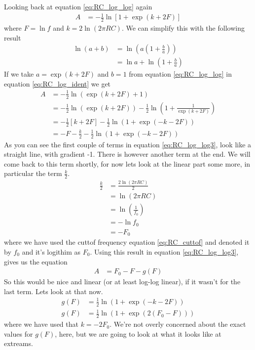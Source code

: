 Looking back at equation \ref{eq:RC_log_log} again
\begin{align}
  A &=-\frac{1}{2}\ln \left[ 1+\exp \left( k + 2F \right) \right] \label{eq:RC_log_log2}
\end{align}
where $F=\ln f$ and $k=2 \ln \left( 2 \pi R C \right)$. We can simplify this with
the following result
\begin{align}
  \ln(a+b) &= \ln\left(a\left(1+\frac{b}{a}\right)\right) \nonumber \\
  &= \ln a + \ln\left(1+\frac{b}{a}\right) \label{eq:RC_log_ident}
\end{align}
If we take $a=\exp \left( k + 2F \right)$ and $b=1$ from equation \ref{eq:RC_log_log} in equation \ref{eq:RC_log_ident} we get
\begin{align}
  A &= -\frac{1}{2}\ln(\exp \left( k + 2F \right)+1) \nonumber \\
  &= -\frac{1}{2}\ln \left(\exp \left( k + 2F \right)\right) -\frac{1}{2}\ln\left(1+\frac{1}{\exp \left( k + 2F \right)}\right) \nonumber \\
  &= -\frac{1}{2}\left[ k + 2F \right]-\frac{1}{2}\ln\left(1+\exp \left( -k - 2F \right)\right)\nonumber \\
  &= -F - \frac{k}{2}-\frac{1}{2}\ln\left(1+\exp \left( -k - 2F \right)\right) \label{eq:RC_log_log3}
\end{align}
As you can see the first couple of terms in equation \ref{eq:RC_log_log3}, look like a straight line, with gradient -1. There is however another term at the end. We will come back to this term shortly, for now lets look at the linear part some more, in particular the term $\frac{k}{2}$.
\begin{align}
  \frac{k}{2} &= \frac{2 \ln \left( 2 \pi R C \right)}{2} \nonumber \\
  &= \ln \left( 2 \pi R C \right) \nonumber \\
  &= \ln \left( \frac{1}{f_0} \right)\nonumber \\
  &= - \ln f_0\nonumber \\
  &= - F_0
\end{align}
where we have used the cuttof frequency equation \ref{eq:RC_cuttof} and denoted it by $f_0$ and it's logithim as $F_0$.
Using this result in equation \ref{eq:RC_log_log3}, gives us the equation
\begin{align}
  A &= F_0 -F -g(F) \label{eq:RC_log_log4}
\end{align}
So this would be nice and linear (or at least log-log linear), if it wasn't for
the last term. Lets look at that now.
\begin{align}
  g(F) &= \frac{1}{2}\ln\left(1+\exp \left( -k - 2F \right)\right) \nonumber \\
  g(F) &= \frac{1}{2}\ln\left(1+\exp \left( 2 (F_0 - F) \right)\right)
\end{align}
where we have used that $k=-2F_0$.
We're not overly concerned about the exact values for $g(F)$, here, but we are
going to look at what it looks like at extreams.


